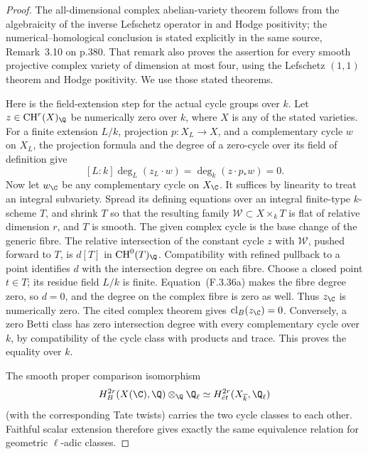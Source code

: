 \begin{proof}
The all-dimensional complex abelian-variety theorem follows from
the algebraicity of the inverse Lefschetz operator in
\cite[Theorem 2A11, p.377]{AuditKleiman1968} and Hodge positivity;
the numerical--homological conclusion is stated explicitly in the
same source, Remark~3.10 on p.380. That remark also proves the
assertion for every smooth projective complex variety of dimension
at most four, using the Lefschetz \((1,1)\) theorem and Hodge
positivity. We use those stated theorems.

Here is the field-extension step for the actual cycle groups over
\(k\). Let \(z\in\operatorname{CH}^r(X)_{\Q}\) be numerically
zero over \(k\), where \(X\) is any of the stated varieties.
For a finite extension
\(L/k\), projection \(p:X_L\to X\), and a complementary cycle
\(w\) on \(X_L\), the projection formula and the degree of a
zero-cycle over its field of definition give
\[
 [L:k]\deg_L(z_L\cdot w)
   =\deg_k(z\cdot p_*w)=0.                     \tag{F.3.36a}
\]
Now let \(w_{\C}\) be any complementary cycle on \(X_{\C}\).
It suffices by linearity to treat an integral subvariety. Spread its
defining equations over an integral finite-type \(k\)-scheme \(T\),
and shrink \(T\) so that the resulting family
\(\mathcal W\subset X\times_kT\) is flat of relative dimension
\(r\), and \(T\) is smooth. The given complex cycle is the base
change of the generic fibre. The relative intersection of the
constant cycle \(z\) with \(\mathcal W\), pushed forward to \(T\),
is \(d[T]\) in \(\operatorname{CH}^0(T)_{\Q}\). Compatibility
with refined pullback to a point identifies \(d\) with the
intersection degree on each fibre. Choose a closed point \(t\in T\);
its residue field \(L/k\) is finite. Equation~(F.3.36a) makes
the fibre degree zero, so \(d=0\), and the degree on the complex
fibre is zero as well. Thus \(z_{\C}\) is numerically zero.
The cited complex theorem gives
\(\operatorname{cl}_B(z_{\C})=0\). Conversely, a zero Betti class
has zero intersection degree with every complementary cycle over
\(k\), by compatibility of the cycle class with products and trace.
This proves the equality over \(k\).

The smooth proper comparison isomorphism
\[
 H_B^{2r}(X(\C),\Q)\otimes_{\Q}\Q_\ell
   \simeq H^{2r}_{\acute e t}(X_{\overline k},\Q_\ell)
\]
(with the corresponding Tate twists) carries the two cycle classes
to each other. Faithful scalar extension therefore gives exactly
the same equivalence relation for geometric \(\ell\)-adic classes.


\end{proof}

